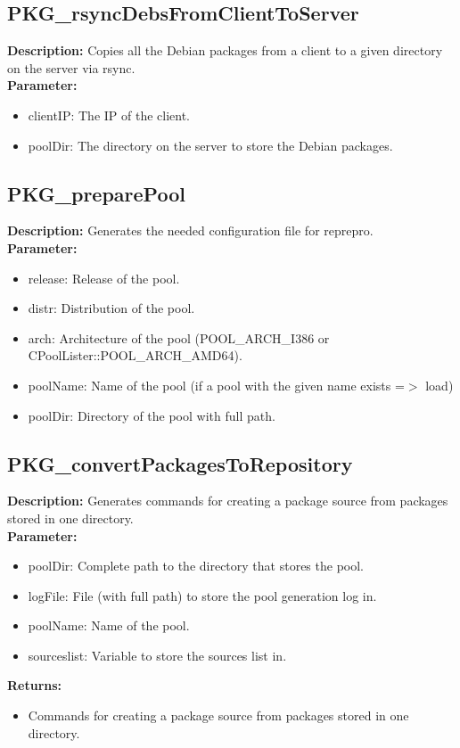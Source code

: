\subsection{PKG\_rsyncDebsFromClientToServer}
\textbf{Description:} Copies all the Debian packages from a client to a given directory on the server via rsync.\\
\textbf{Parameter:}
\begin{itemize}
\item clientIP: The IP of the client.
\item poolDir: The directory on the server to store the Debian packages.
\end{itemize}

\subsection{PKG\_preparePool}
\textbf{Description:} Generates the needed configuration file for reprepro.\\
\textbf{Parameter:}
\begin{itemize}
\item release: Release of the pool.
\item distr: Distribution of the pool.
\item arch: Architecture of the pool (POOL\_ARCH\_I386 or CPoolLister::POOL\_ARCH\_AMD64).
\item poolName: Name of the pool (if a pool with the given name exists =$>$ load)
\item poolDir: Directory of the pool with full path.
\end{itemize}

\subsection{PKG\_convertPackagesToRepository}
\textbf{Description:} Generates commands for creating a package source from packages stored in one directory.\\
\textbf{Parameter:}
\begin{itemize}
\item poolDir: Complete path to the directory that stores the pool.
\item logFile: File (with full path) to store the pool generation log in.
\item poolName: Name of the pool.
\item sourceslist: Variable to store the sources list in.
\end{itemize}
\textbf{Returns:}
\begin{itemize}
\item Commands for creating a package source from packages stored in one directory.
\end{itemize}

